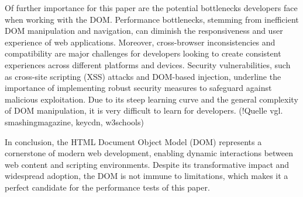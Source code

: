 Of further importance for this paper are the potential bottlenecks developers face when working with the DOM. Performance bottlenecks, stemming from inefficient DOM manipulation and navigation, can diminish the responsiveness and user experience of web applications. Moreover, cross-browser inconsistencies and compatibility are major challenges for developers looking to create consistent experiences across different platforms and devices. Security vulnerabilities, such as cross-site scripting (XSS) attacks and DOM-based injection, underline the importance of implementing robust security measures to safeguard against malicious exploitation. Due to its steep learning curve and the general complexity of DOM manipulation, it is very difficult to learn for developers. (!Quelle vgl. smashingmagazine, keycdn, w3schools)

In conclusion, the HTML Document Object Model (DOM) represents a cornerstone of modern web development, enabling dynamic interactions between web content and scripting environments. Despite its transformative impact and widespread adoption, the DOM is not immune to limitations, which makes it a perfect candidate for the performance tests of this paper.